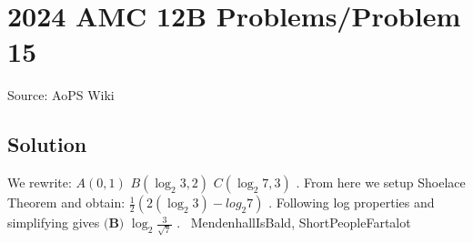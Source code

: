 \documentclass[12pt]{article}
\begin{document}
\section*{{2024 AMC 12B Problems/Problem 15}}
Source: AoPS Wiki

\subsection*{Solution}
We rewrite: $A(0,1)$ $B(\log _{2} 3, 2)$ $C(\log _{2} 7, 3)$ . From here we setup Shoelace Theorem and obtain: $\frac{1}{2}(2(\log _{2} 3) - log _{2} 7)$ . Following log properties and simplifying gives $\boxed{\textbf{(B) }\log_2 \frac{3}{\sqrt{7}}}$ . ~MendenhallIsBald, ShortPeopleFartalot
\end{document}
